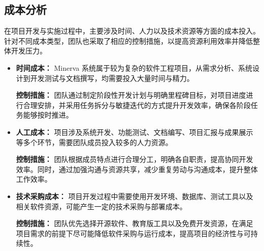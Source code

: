 \subsection{成本分析}

在项目开发与实施过程中，主要涉及时间、人力以及技术资源等方面的成本投入。针对不同成本类型，团队也采取了相应的控制措施，以提高资源利用效率并降低整体开发压力。

\begin{itemize}
	\item \textbf{时间成本：} Minerva 系统属于较为复杂的软件工程项目，从需求分析、系统设计到开发测试与文档撰写，均需要投入大量时间与精力。
	
	\textbf{控制措施：} 团队通过制定阶段性开发计划与明确里程碑目标，对项目进度进行合理安排，并采用任务拆分与敏捷迭代的方式提升开发效率，确保各阶段任务能够按时推进。

	\item \textbf{人工成本：} 项目涉及系统开发、功能测试、文档编写、项目汇报与成果展示等多个环节，需要团队成员投入较多的人力资源。
	
	\textbf{控制措施：} 团队根据成员特点进行合理分工，明确各自职责，提高协同开发效率。同时，通过加强沟通与资源共享，减少重复劳动与沟通成本，提升整体工作效率。

	\item \textbf{技术采购成本：} 项目开发过程中需要使用开发环境、数据库、测试工具以及相关软件资源，可能产生一定的技术采购与部署成本。
	
	\textbf{控制措施：} 团队优先选择开源软件、教育版工具以及免费开发资源，在满足项目需求的前提下尽可能降低软件采购与运行成本，提高项目的经济性与可持续性。
\end{itemize}
